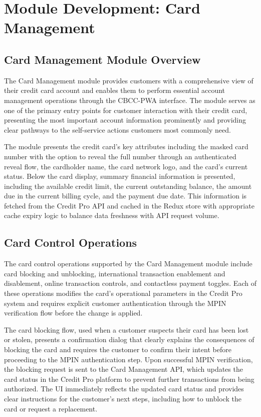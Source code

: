 \section{Module Development: Card Management}

\subsection{Card Management Module Overview}

The Card Management module provides customers with a comprehensive view of their credit card account and enables them to perform essential account management operations through the CBCC-PWA interface. The module serves as one of the primary entry points for customer interaction with their credit card, presenting the most important account information prominently and providing clear pathways to the self-service actions customers most commonly need.

The module presents the credit card's key attributes including the masked card number with the option to reveal the full number through an authenticated reveal flow, the cardholder name, the card network logo, and the card's current status. Below the card display, summary financial information is presented, including the available credit limit, the current outstanding balance, the amount due in the current billing cycle, and the payment due date. This information is fetched from the Credit Pro API and cached in the Redux store with appropriate cache expiry logic to balance data freshness with API request volume.

\subsection{Card Control Operations}

The card control operations supported by the Card Management module include card blocking and unblocking, international transaction enablement and disablement, online transaction controls, and contactless payment toggles. Each of these operations modifies the card's operational parameters in the Credit Pro system and requires explicit customer authentication through the MPIN verification flow before the change is applied.

The card blocking flow, used when a customer suspects their card has been lost or stolen, presents a confirmation dialog that clearly explains the consequences of blocking the card and requires the customer to confirm their intent before proceeding to the MPIN authentication step. Upon successful MPIN verification, the blocking request is sent to the Card Management API, which updates the card status in the Credit Pro platform to prevent further transactions from being authorized. The UI immediately reflects the updated card status and provides clear instructions for the customer's next steps, including how to unblock the card or request a replacement.

